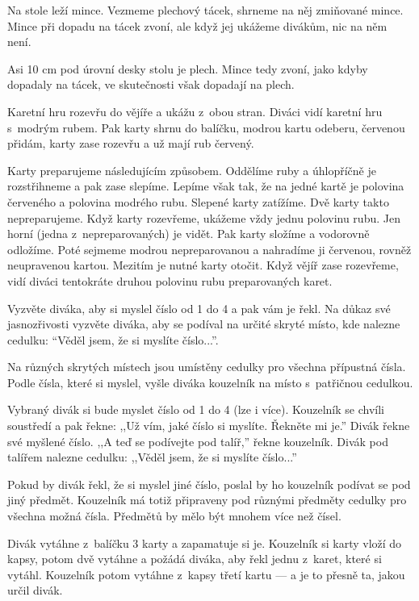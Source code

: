 Na stole leží mince. Vezmeme plechový tácek, shrneme 
na něj zmiňované mince. Mince při dopadu na tácek zvoní, ale 
když jej ukážeme divákům, nic na něm není.

Asi 10 cm pod úrovní desky stolu je plech. Mince tedy zvoní, 
jako kdyby dopadaly na tácek, ve skutečnosti však dopadají na 
plech.


Karetní hru rozevřu do vějíře a ukážu z~obou stran. 
Diváci vidí karetní hru s~modrým rubem. Pak karty shrnu 
do balíčku, modrou kartu odeberu, červenou přidám, karty zase 
rozevřu a už mají rub červený.

Karty preparujeme následujícím způsobem. Oddělíme ruby a 
úhlopříčně je rozstřihneme a pak zase slepíme. Lepíme však tak, 
že na jedné kartě je polovina červeného a polovina modrého rubu. 
Slepené karty zatížíme. Dvě karty takto nepreparujeme. Když karty 
rozevřeme, ukážeme vždy jednu polovinu rubu. Jen horní (jedna 
z~nepreparovaných) je vidět. Pak karty složíme a vodorovně 
odložíme. Poté sejmeme modrou nepreparovanou a nahradíme ji červenou, 
rovněž neupravenou kartou. Mezitím je nutné karty otočit. Když 
vějíř zase rozevřeme, vidí diváci tentokráte druhou polovinu 
rubu preparovaných karet.


Vyzvěte diváka, aby si myslel číslo od 1 do 4 a pak vám 
je řekl. Na důkaz své jasnozřivosti vyzvěte diváka, aby se podíval 
na určité skryté místo, kde nalezne cedulku: ``Věděl jsem, že 
si myslíte číslo...''.


Na různých skrytých místech jsou umístěny cedulky pro všechna 
přípustná čísla. Podle čísla, které si myslel, vyšle diváka kouzelník 
na místo s~patřičnou cedulkou.


Vybraný divák si bude myslet číslo od 1 do 4 (lze i více). 
Kouzelník se chvíli soustředí a pak řekne: ,,Už vím, jaké 
číslo si myslíte. Řekněte mi je.'' Divák řekne své myšlené 
číslo. ,,A teď se podívejte pod talíř,'' řekne kouzelník. 
Divák pod talířem nalezne cedulku: ,,Věděl jsem, že si 
myslíte číslo...''

Pokud by divák řekl, že si myslel jiné číslo, poslal by ho 
kouzelník podívat se pod jiný předmět. Kouzelník má totiž připraveny 
pod různými předměty cedulky pro všechna možná čísla. Předmětů 
by mělo být mnohem více než čísel.


Divák vytáhne z~balíčku 3 karty a zapamatuje si 
je. Kouzelník si karty vloží do kapsy, potom dvě vytáhne a požádá 
diváka, aby řekl jednu z~karet, které si vytáhl. Kouzelník 
potom vytáhne z~kapsy třetí kartu --- a je to přesně ta, 
jakou určil divák.

